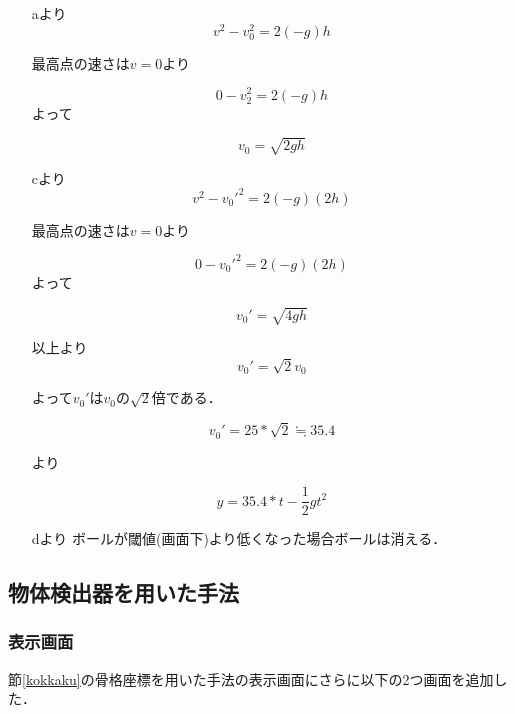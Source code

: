 \begin{itemize}
    \item[aより]
        \begin{equation}
            v^2-v_0^2=2(-g)h
        \end{equation}

        最高点の速さは$v=0$より 

        \begin{equation}
            0-v_2^2=2(-g)h
        \end{equation}
\clearpage
        よって

        \begin{equation}
            v_0=\sqrt{2gh}
        \end{equation}

    \item[cより]
        \begin{equation}
            v^2-v_0'^2=2(-g)(2h)
        \end{equation}

        最高点の速さは$v=0$より 

        \begin{equation}
            0-v_0'^2=2(-g)(2h)
        \end{equation}
        よって

        \begin{equation}
            v_0'=\sqrt{4gh}
        \end{equation}

    \item[以上より]
        \begin{equation}
            v_0'=\sqrt{2}v_0
        \end{equation}

        よって$v_0'$は$v_0$の$\sqrt{2}$倍である． 

        \begin{equation}
            v_0'=25*\sqrt{2} \fallingdotseq 35.4 
        \end{equation}

        より

        \begin{equation}
            y=35.4*t-\frac{1}{2}gt^2
        \end{equation}

    \item[dより] ボールが閾値(画面下)より低くなった場合ボールは消える． 

\end{itemize}


\clearpage
\subsection{物体検出器を用いた手法}
\subsubsection{表示画面}
節\ref{kokkaku}の骨格座標を用いた手法の表示画面にさらに以下の2つ画面を追加した．